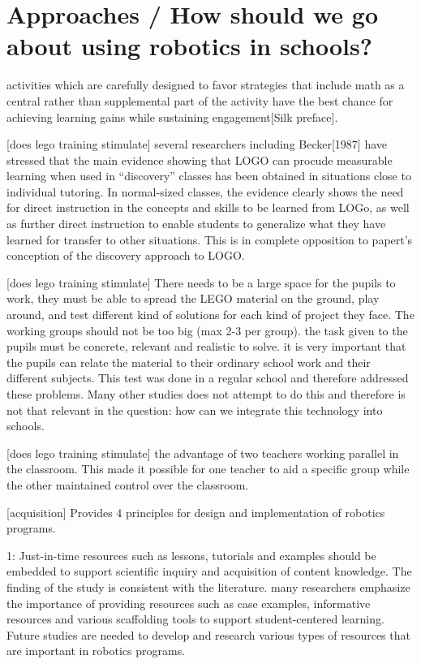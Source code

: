 \section{Approaches / How should we go about using robotics in schools?}
activities which are carefully designed to favor strategies that include math as a central rather than supplemental part of the activity have the best chance for achieving learning gains while sustaining engagement[Silk preface]. 

[does lego training stimulate] several researchers including Becker[1987] have stressed that the main evidence showing that LOGO can procude measurable learning when used in “discovery” classes has been obtained in situations close to individual tutoring. In normal-sized classes, the evidence clearly shows the need for direct instruction in the concepts and skills to be learned from LOGo, as well as further direct instruction to enable students to generalize what they have learned for transfer to other situations. This is in complete opposition to papert’s conception of the discovery approach to LOGO.

[does lego training stimulate] There needs to be a large space for the pupils to work, they must be able to spread the LEGO material on the ground, play around, and test different kind of solutions for each kind of project they face. The working groups should not be too big (max 2-3 per group). the task given to the pupils must be concrete, relevant and realistic to solve. it is very important that the pupils can relate the material to their ordinary school work and their different subjects. This test was done in a regular school and therefore addressed these problems. Many other studies does not attempt to do this and therefore is not that relevant in the question: how can we integrate this technology into schools. 

[does lego training stimulate] the advantage of two teachers working parallel in the classroom. This made it possible for one teacher to aid a specific group while the other maintained control over the classroom. 

[acquisition] Provides 4 principles for design and implementation of robotics programs. 

1: Just-in-time resources such as lessons, tutorials and examples should be embedded to support scientific inquiry and acquisition of content knowledge. The finding of the study is consistent with the literature. many researchers emphasize the importance of providing resources such as case examples, informative resources and various scaffolding tools to support student-centered learning. Future studies are needed to develop and research various types of resources that are important in robotics programs. 

